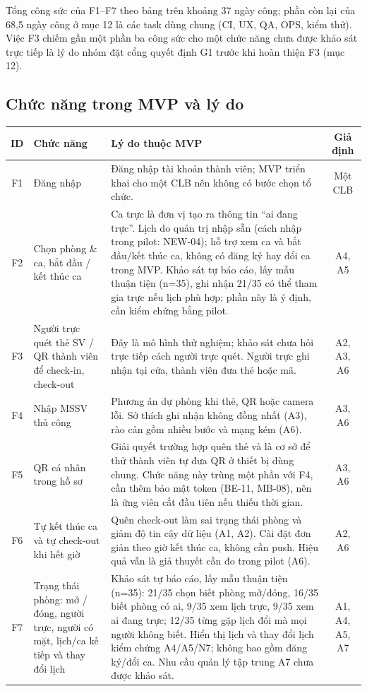 \medskip
Tổng công sức của F1--F7 theo bảng trên khoảng 37 ngày công; phần còn lại của 68,5 ngày công ở mục 12 là các task dùng chung (CI, UX, QA, OPS, kiểm thử). Việc F3 chiếm gần một phần ba công sức cho một chức năng chưa được khảo sát trực tiếp là lý do nhóm đặt cổng quyết định G1 trước khi hoàn thiện F3 (mục 12).

\subsection{Chức năng trong MVP và lý do}
\small
\begin{tabularx}{\textwidth}{|c|X|X|c|}
\hline
\textbf{ID} & \textbf{Chức năng} & \textbf{Lý do thuộc MVP} & \textbf{Giả định} \\ \hline
F1 & Đăng nhập & Đăng nhập tài khoản thành viên; MVP triển khai cho một CLB nên không có bước chọn tổ chức. & Một CLB \\ \hline
F2 & Chọn phòng \& ca, bắt đầu / kết thúc ca & Ca trực là đơn vị tạo ra thông tin ``ai đang trực''. Lịch do quản trị nhập sẵn (cách nhập trong pilot: NEW-04); hỗ trợ xem ca và bắt đầu/kết thúc ca, không có đăng ký hay đổi ca trong MVP. Khảo sát tự báo cáo, lấy mẫu thuận tiện (n=35), ghi nhận 21/35 có thể tham gia trực nếu lịch phù hợp; phần này là ý định, cần kiểm chứng bằng pilot. & A4, A5 \\ \hline
F3 & Người trực quét thẻ SV / QR thành viên để check-in, check-out & Đây là mô hình thử nghiệm; khảo sát chưa hỏi trực tiếp cách người trực quét. Người trực ghi nhận tại cửa, thành viên đưa thẻ hoặc mã. & A2, A3, A6 \\ \hline
F4 & Nhập MSSV thủ công & Phương án dự phòng khi thẻ, QR hoặc camera lỗi. Sở thích ghi nhận không đồng nhất (A3), rào cản gồm nhiều bước và mạng kém (A6). & A3, A6 \\ \hline
F5 & QR cá nhân trong hồ sơ & Giải quyết trường hợp quên thẻ và là cơ sở để thử thành viên tự đưa QR ở thiết bị dùng chung. Chức năng này trùng một phần với F4, cần thêm bảo mật token (BE-11, MB-08), nên là ứng viên cắt đầu tiên nếu thiếu thời gian. & A3, A6 \\ \hline
F6 & Tự kết thúc ca và tự check-out khi hết giờ & Quên check-out làm sai trạng thái phòng và giảm độ tin cậy dữ liệu (A1, A2). Cài đặt đơn giản theo giờ kết thúc ca, không cần push. Hiệu quả vẫn là giả thuyết cần đo trong pilot (A6). & A2, A6 \\ \hline
F7 & Trạng thái phòng: mở / đóng, người trực, người có mặt, lịch/ca kế tiếp và thay đổi lịch & Khảo sát tự báo cáo, lấy mẫu thuận tiện (n=35): 21/35 chọn biết phòng mở/đóng, 16/35 biết phòng có ai, 9/35 xem lịch trực, 9/35 xem ai đang trực; 12/35 từng gặp lịch đổi mà mọi người không biết. Hiển thị lịch và thay đổi lịch kiểm chứng A4/A5/N7; không bao gồm đăng ký/đổi ca. Nhu cầu quản lý tập trung A7 chưa được khảo sát. & A1, A4, A5, A7 \\ \hline
\end{tabularx}
\normalsize

